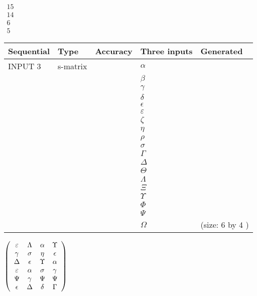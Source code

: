 \documentclass[12pt]{article}
\begin{document}
   
 $\begin{array}{
 c
 }
          15  \\ 
          14  \\ 
           6  \\ 
           5
\end{array}  $ 
  
  
\noindent\begin{tabular}{|l|l|l|l|l|}
\hline
 Sequential & Type & Accuracy & Three inputs & Generated \\ 
\hline
 
 
  INPUT $            3 $ & s-matrix & & 
 $  \alpha $ & 
  \\
  & & & 
 $  \beta $ & 
  \\
  & & & 
 $  \gamma $ & 
  \\
  & & & 
 $  \delta $ & 
  \\
  & & & 
 $  \epsilon $ & 
  \\
  & & & 
 $  \varepsilon $ & 
  \\
  & & & 
 $                     \zeta $ & 
  \\
  & & & 
 $  \eta $ & 
  \\
  & & & 
 $  \rho $ & 
  \\
  & & & 
 $  \sigma $ & 
  \\
  & & & 
 $  \Gamma $ & 
  \\
  & & & 
 $  \Delta $ & 
  \\
  & & & 
 $  \Theta $ & 
  \\
  & & & 
 $  \Lambda $ & 
  \\
  & & & 
 $                     \Xi $ & 
  \\
  & & & 
 $  \Upsilon $ & 
  \\
  & & & 
 $  \Phi $ & 
  \\
  & & & 
 $  \Psi $ & 
  \\
  & & & 
 $  \Omega $ & 
  (size:            6  by            4 )
 \\  \hline  
 \end{tabular}
   
   
 $  \left( \begin{array}
 {
 c
 c
 c
 c
 }
 \varepsilon & 
 \Lambda & 
 \alpha & 
 \Upsilon \\ 
 \gamma & 
 \sigma & 
 \eta & 
 \epsilon \\ 
 \Delta & 
 \epsilon & 
 \Upsilon & 
 \alpha \\ 
 \varepsilon & 
 \alpha & 
 \sigma & 
 \gamma \\ 
 \Psi & 
 \gamma & 
 \Psi & 
 \Psi \\ 
 \epsilon & 
 \Delta & 
 \delta & 
 \Gamma
 \end{array} \right) $ 
  
\end{document}
